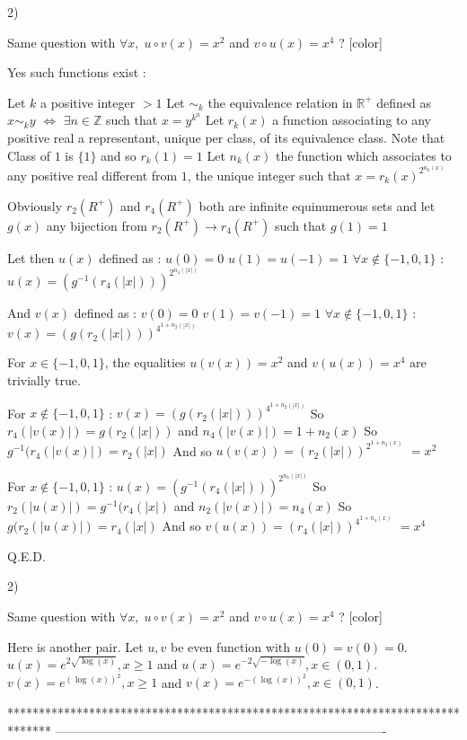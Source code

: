 \begin{solution}
	\begin{tcolorbox}[color=#000080]\begin{bolded}2)\end{bolded}  Same question with  $\forall x, \; u\circ v(x)=x^2$ and $v\circ u(x)=x^4$ ? [\/color]\end{tcolorbox}
Yes such functions exist :

Let $k$ a positive integer $>1$
Let $\sim_k$ the equivalence relation in $\mathbb R^+$ defined as $x\sim_k y$ $\iff$ $\exists n\in\mathbb Z$ such that ${x=y^{k^n}}$
Let $r_k(x)$ a function associating to any positive real a representant, unique per class, of its equivalence class.
Note that Class of $1$ is $\{1\}$ and so $r_k(1)=1$
Let $n_k(x)$ the function which associates to any positive real different from $1$, the unique integer such that $x=r_k(x)^{2^{n_k(x)}}$

Obviously $r_2(%
R^+)$ and $r_4(%
R^+)$ both are infinite equinumerous sets and let $g(x)$ any bijection from $r_2(%
R^+)\to r_4(%
R^+)$ such that $g(1)=1$

Let then $u(x)$ defined as :
$u(0)=0$
$u(1)=u(-1)=1$
$\forall x\notin\{-1,0,1\}$ : $u(x)=(g^{-1}(r_4(|x|)))^{2^{n_4(|x|)}}$

And $v(x)$ defined as :
$v(0)=0$
$v(1)=v(-1)=1$
$\forall x\notin\{-1,0,1\}$ : $v(x)=(g(r_2(|x|)))^{4^{1+n_2(|x|)}}$

For $x\in\{-1,0,1\}$, the equalities $u(v(x))=x^2$ and $v(u(x))=x^4$ are trivially true.

For $x\notin\{-1,0,1\}$ :
$v(x)=(g(r_2(|x|)))^{4^{1+n_2(|x|)}}$
So $r_4(|v(x)|)=g(r_2(|x|))$ and $n_4(|v(x)|)=1+n_2(x)$
So $g^{-1}(r_4(|v(x)|)=r_2(|x|)$
And so $u(v(x))=(r_2(|x|))^{2^{1+n_2(x)}}$ $=x^2$

For $x\notin\{-1,0,1\}$ :
$u(x)=(g^{-1}(r_4(|x|)))^{2^{n_4(|x|)}}$
So $r_2(|u(x)|)=g^{-1}(r_4(|x|)$ and $n_2(|v(x)|)=n_4(x)$
So $g(r_2(|u(x)|)=r_4(|x|)$
And so $v(u(x))=(r_4(|x|))^{4^{1+n_4(x)}}$ $=x^4$

Q.E.D.
\end{solution}



\begin{solution}
	\begin{tcolorbox}[color=#000080]
\begin{bolded}2)\end{bolded}  Same question with  $\forall x, \; u\circ v(x)=x^2$ and $v\circ u(x)=x^4$ ? [\/color]\end{tcolorbox}
Here is another pair.
Let $u,v$ be even function with $u(0)=v(0)=0$.
$u(x)=e^{2\sqrt{\log(x)}},x\ge1$ and $u(x)=e^{-2\sqrt{-\log(x)}},x\in(0,1)$.
$v(x)=e^{(\log(x))^2},x\ge1$ and $v(x)=e^{-(\log(x))^2},x\in(0,1)$.
\end{solution}
*******************************************************************************
-------------------------------------------------------------------------------

